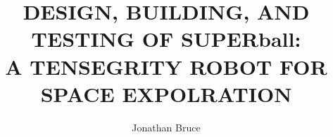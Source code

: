 \title{DESIGN, BUILDING, AND TESTING OF SUPERball:\\ A TENSEGRITY ROBOT FOR SPACE EXPOLRATION}
\author{Jonathan Bruce}

\maketitle

